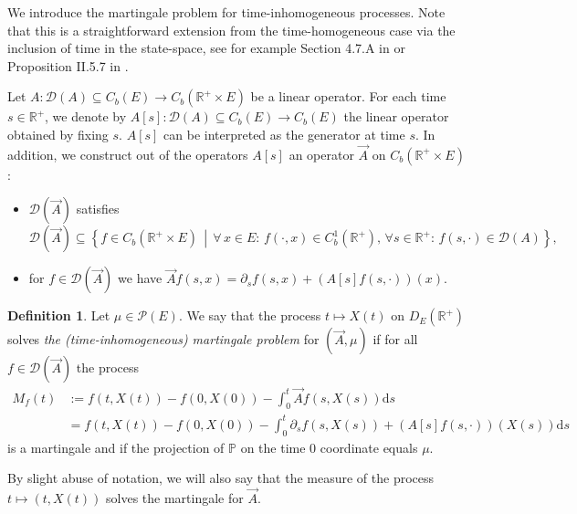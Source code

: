 \documentclass[a4paper]{article}
\newcommand{\cD}{\mathcal{D}}
\newcommand{\cP}{\mathcal{P}}
\newcommand{\bR}{\mathbb{R}}
\newcommand{\PR}{\mathbb{P}}
\newcommand{\dd}{ \mathrm{d}}
\numberwithin{equation}{section}
\theoremstyle{definition}
\newtheorem{definition}[theorem]{Definition}
\begin{document}
We introduce the martingale problem for time-inhomogeneous processes. Note that this is a straightforward extension from the time-homogeneous case via the inclusion of time in the state-space, see for example Section 4.7.A in \cite{EK86} or Proposition II.5.7 in \cite{Pe02}. 



Let $A : \cD(A) \subseteq C_b(E) \rightarrow C_b(\bR^+ \times E)$ be a linear operator. For each time $s \in \bR^+$, we denote by $A[s] : \cD(A) \subseteq C_b(E) \rightarrow C_b(E)$ the linear operator obtained by fixing $s$. $A[s]$ can be interpreted as the generator at time $s$. In addition, we construct out of the operators $A[s]$ an operator $\vec{A}$ on $C_b(\bR^+ \times E)$:
\begin{itemize}
	\item $\cD(\vec{A})$ satisfies
	\begin{equation*}
		\cD(\vec{A}) \subseteq \left\{f \in C_b(\bR^+ \times E) \, \middle| \, \forall \, x \in E \colon \, f(\cdot,x) \in C^1_b(\bR^+), \, \forall s \in \bR^+ \colon \, f(s,\cdot) \in \cD(A) \right\},
	\end{equation*}
	\item for $f \in \cD(\vec{A})$ we have $\vec{A}f(s,x) = \partial_s f(s,x) + (A[s]f(s,\cdot))(x)$.
\end{itemize}



\begin{definition}
	Let $\mu \in \cP(E)$. We say that the process $t \mapsto X(t)$ on $D_E(\bR^+)$ solves \textit{the (time-inhomogeneous) martingale problem} for $(\vec{A},\mu)$ if for all $f \in \cD(\vec{A})$ the process
	\begin{align*}
		M_f(t) & := f(t,X(t)) - f(0,X(0))  - \int_0^t  \vec{A} f(s,X(s)) \dd s \\
		& = f(t,X(t)) -  f(0,X(0)) - \int_0^t \partial_s f(s,X(s)) +  (A[s]f(s,\cdot))(X(s)) \dd s 
	\end{align*}
	is a martingale and if the projection of $\PR$ on the time $0$ coordinate equals $\mu$. 
	
	By slight abuse of notation, we will also say that the measure of the process $t \mapsto (t,X(t))$ solves the martingale for $\vec{A}$.
\end{definition}
\end{document}
